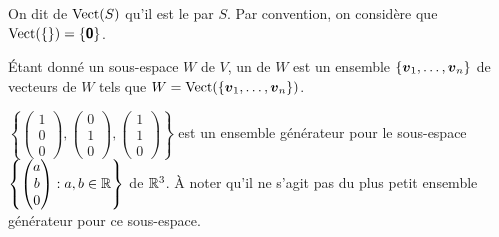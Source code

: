 On dit de $\operatorname{Vect}(S)$ qu'il est le  par $S$.
Par convention, on considère que $\operatorname{Vect}(\{\}) = \{\mbox{\textsf{\textbf{{0}}}}\}$.

Étant donné un sous-espace $W$ de $V$, un  de $W$ est
un ensemble $\{\boldsymbol{v}_1, \ldots, \boldsymbol{v}_n\}$ de vecteurs de $W$ tels que
$W = \operatorname{Vect}(\{\boldsymbol{v}_1, \ldots, \boldsymbol{v}_n\})$.
\begin{exemple}\label{exemple:lin-dep}
$\displaystyle
\left\{ \begin{pmatrix}
1 \\
0 \\
0
\end{pmatrix},
\begin{pmatrix}
0\\
1\\
0
\end{pmatrix},
\begin{pmatrix}
1\\
1\\
0
\end{pmatrix}
\right\}
$
est un ensemble générateur pour le sous-espace $\displaystyle \left\{ \begin{pmatrix}
a \\
b\\
0
\end{pmatrix}:
a, b \in\mathbb{R}\right\}
$
de $\mathbb{R}^3$.  À noter qu'il ne s'agit pas du plus petit ensemble générateur pour ce sous-espace.
\end{exemple}

